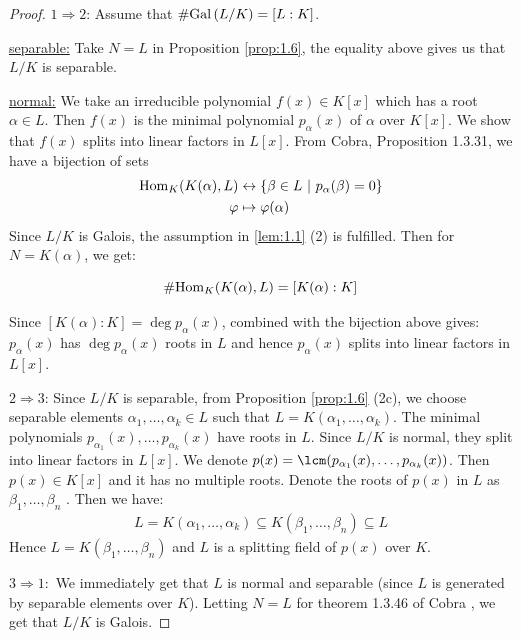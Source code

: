 \documentclass[twoside = false,	%
		headsepline,		%
		parskip = true,
		]{scrbook}						%
\begin{document}
        \begin{proof}
        	$1 \Rightarrow 2$: Assume that $\#\mathrm{Gal}\left( L/K\right) = [L:K]$.
        	
        	\underline{separable:} Take $N=L$ in Proposition \ref{prop:1.6}, the equality above gives us that $L/K$ is separable.
        	
        	\underline{normal:} We take an irreducible polynomial $f(x) \in K[x]$ which has a root $\alpha \in L$. Then $f(x)$ is the minimal polynomial $p_\alpha(x)$ of $\alpha$ over $K[x]$. We show that $f(x)$ splits into linear factors in $L[x]$.
        	From Cobra, Proposition 1.3.31, we have a bijection of sets
        	\begin{align*}
        			\mathrm{Hom}_K(K(\alpha),L) &\leftrightarrow \{\beta \in L \ | \ p_\alpha(\beta) = 0\} \\
        			\varphi &\mapsto \varphi(\alpha)
        	\end{align*}
        	Since $L/K$ is Galois, the assumption in \ref{lem:1.1} (2) is fulfilled. Then for $N=K(\alpha)$, we get:
        	
        	\begin{equation*}
        	    \#\mathrm{Hom}_K(K(\alpha),L) = [K(\alpha):K]
        	\end{equation*}
        	
        	Since $[K(\alpha):K] = \deg p_\alpha(x) $, combined with the bijection above gives: $p_\alpha(x)$ has $\deg p_\alpha(x)$ roots in $L$ and hence $p_\alpha(x)$ splits into linear factors in $L[x]$.
        	
        	$2 \Rightarrow 3$: Since $L/K$ is separable, from Proposition \ref{prop:1.6} (2c), we choose separable elements $\alpha_1,\dots,\alpha_k \in L$ such that $L = K(\alpha_1,\dots,\alpha_k)$. The minimal polynomials $p_{\alpha_1}(x),\dots,p_{\alpha_k}(x)$ have roots in $L$. Since $L/K$ is normal, they split into linear factors in $L[x]$.
        	We denote $p(x) = \lcm(p_{\alpha_1}(x),\dots,p_{\alpha_k}(x))$. Then $p(x) \in K[x]$ and it has no multiple roots. Denote the roots of $p(x)$ in $L$ as $\beta_1, \dots, \beta_n$ . Then we have:
        	\begin{align*}
        		L = K(\alpha_1, \dots, \alpha_k) \subseteq K(\beta_1,\dots,\beta_n)\subseteq L
        	\end{align*}
        	Hence $L = K(\beta_1,\dots,\beta_n)$ and $L$ is a splitting field of $p(x)$ over $K$.
        	
        	$3 \Rightarrow 1:$ We immediately get that $L$ is normal and separable (since $L$ is generated by separable elements over $K$). Letting $N=L$ for theorem 1.3.46 of Cobra \cite{Cobra}, we get that $L/K$ is Galois. 
        \end{proof}
        
\end{document}
